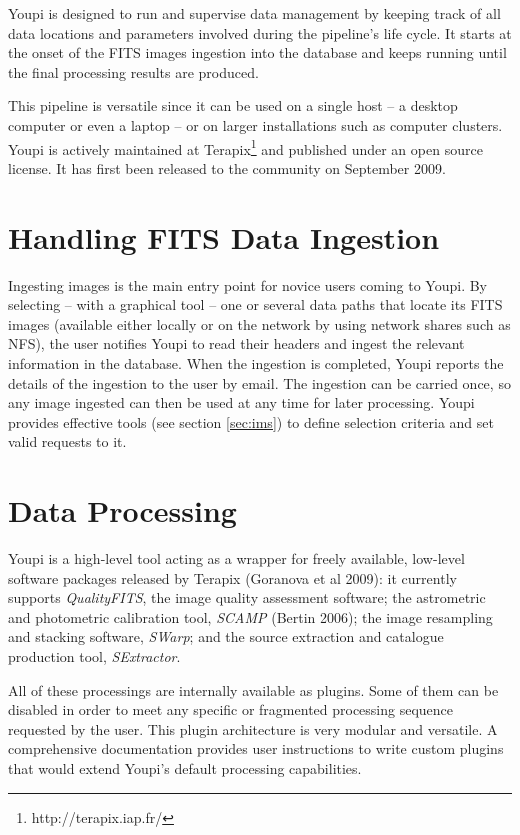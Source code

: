 \documentclass[11pt,twoside]{article}  %
\begin{document}
Youpi is designed to run and supervise data management by keeping track of all data locations 
and parameters involved during the pipeline's life cycle. It starts at the onset of the FITS 
images ingestion into the database and keeps running until the final processing results are 
produced.

This pipeline is versatile since it can be used on a single host -- a desktop computer or even 
a laptop -- or on larger installations such as computer clusters. Youpi is actively maintained 
at Terapix\footnote{http://terapix.iap.fr/} and published under an open source license. It has 
first been released to the community on September 2009.

\section{Handling FITS Data Ingestion}

Ingesting images is the main entry point for novice users coming to Youpi. By selecting -- with 
a graphical tool -- one or several data paths that locate its FITS images (available either 
locally or on the network by using network shares such as NFS), the user notifies Youpi to read 
their headers and ingest the relevant information in the database. When the ingestion is completed, 
Youpi reports the details of the ingestion to the user by email. The ingestion can be carried 
once, so any image ingested can then be used at any time for later processing. Youpi provides 
effective tools (see section \ref{sec:ims}) to define selection criteria and set valid requests 
to it. 

\section{Data Processing}

Youpi is a high-level tool acting as a wrapper for freely available, low-level software packages 
released by Terapix (Goranova et al 2009): it currently supports \emph{QualityFITS}, the image 
quality assessment software; the astrometric and photometric calibration tool, \emph{SCAMP} 
(Bertin 2006); the image resampling and stacking software, \emph{SWarp}; and the source extraction 
and catalogue production tool, \emph{SExtractor}.

All of these processings are internally available as plugins. Some of them can be disabled 
in order to meet any specific or fragmented processing sequence requested by the user. This 
plugin architecture is very modular and versatile. A comprehensive documentation provides user 
instructions to write custom plugins that would extend Youpi's default processing capabilities.
\end{document}
